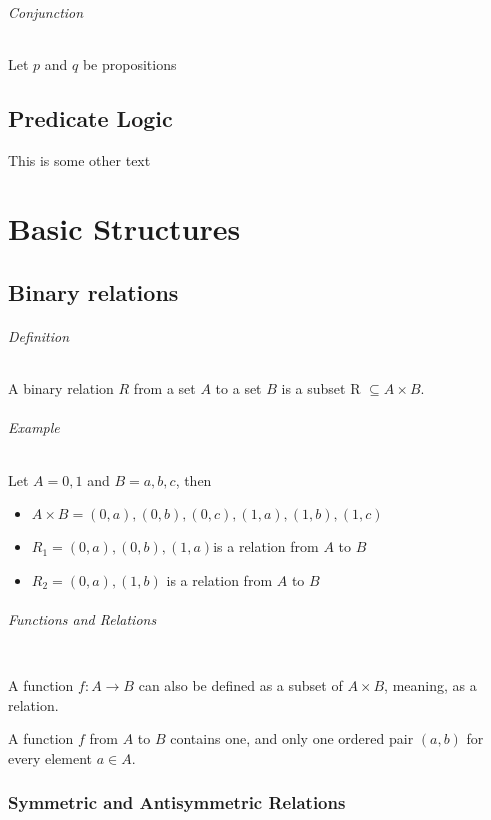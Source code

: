 \documentclass[10pt,a4paper]{book}
\begin{document}
\paragraph*{Conjunction}
Let $p$ and $q$ be propositions 

\chapter{Predicate Logic}

This is some other text

\part{Basic Structures}

\chapter{Binary relations}

\paragraph*{Definition}
A binary relation $R$ from a set $A$ to a set $B$ is a subset R $\subseteq A \times B$.

\paragraph*{Example}
Let $A = {0,1}$ and $B = {a,b,c}$, then
\begin{itemize}
\item $A \times B ={(0, a),(0, b),(0, c),(1, a), (1, b), (1, c)}$
\item $R_1 ={(0, a), (0, b), (1, a)}$is a relation from $A$ to $B$
\item $R_2 ={(0, a), (1,b)}$ is a relation from $A$ to $B$
\end{itemize}

\paragraph*{Functions and Relations}
$\ $\par 
A function $f:A \to B$ can also be defined as a subset of $A \times B$, meaning, as a relation.\par
A function $f$ from $A$ to $B$ contains one, and only one ordered pair $(a,b)$ for every element $a \in A$.

\section{Symmetric and Antisymmetric Relations}
\end{document}
